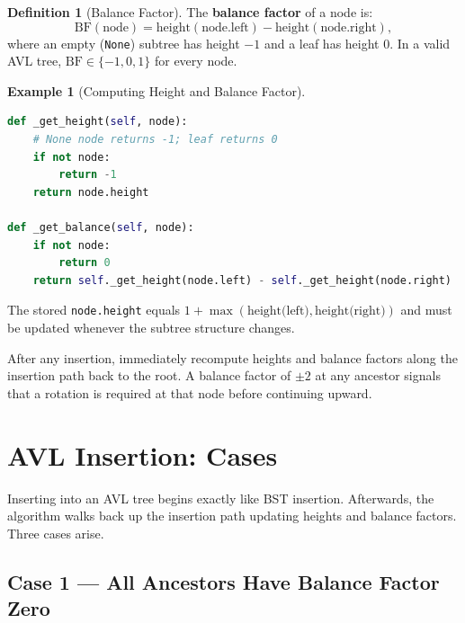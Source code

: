 \documentclass[11pt, a4paper, notitlepage]{report}
\theoremstyle{definition}
\newtheorem{definition}[theorem]{Definition}
\theoremstyle{remark}
\theoremstyle{definition}
\newtheorem{example}[theorem]{Example}
\begin{document}
\begin{definition}[Balance Factor]
\label{def:balance-factor}
The \textbf{balance factor} of a node is:
\[
  \text{BF}(\text{node}) = \text{height}(\text{node.left}) - \text{height}(\text{node.right}),
\]
where an empty (\texttt{None}) subtree has height $-1$ and a leaf has height $0$.
In a valid AVL tree, $\text{BF} \in \{-1, 0, 1\}$ for every node.
\end{definition}

\begin{example}[Computing Height and Balance Factor]
\label{ex:avl-helpers}
\leavevmode
\begin{lstlisting}[language=Python]
def _get_height(self, node):
    # None node returns -1; leaf returns 0
    if not node:
        return -1
    return node.height

def _get_balance(self, node):
    if not node:
        return 0
    return self._get_height(node.left) - self._get_height(node.right)
\end{lstlisting}
The stored \texttt{node.height} equals $1 + \max(\text{height(left)}, \text{height(right)})$
and must be updated whenever the subtree structure changes.
\end{example}

\begin{warning}[title={Warning: BF Outside $\{-1,0,1\}$ Signals an Imbalance}]
After any insertion, immediately recompute heights and balance factors along the insertion
path back to the root.  A balance factor of $\pm 2$ at any ancestor signals that a rotation
is required at that node before continuing upward.
\end{warning}

\section{AVL Insertion: Cases}
\label{sec:avl-insertion-cases}

Inserting into an AVL tree begins exactly like BST insertion.  Afterwards, the algorithm
walks back up the insertion path updating heights and balance factors.  Three cases arise.

\subsection{Case 1 --- All Ancestors Have Balance Factor Zero}
\label{subsec:avl-case1}
\end{document}

